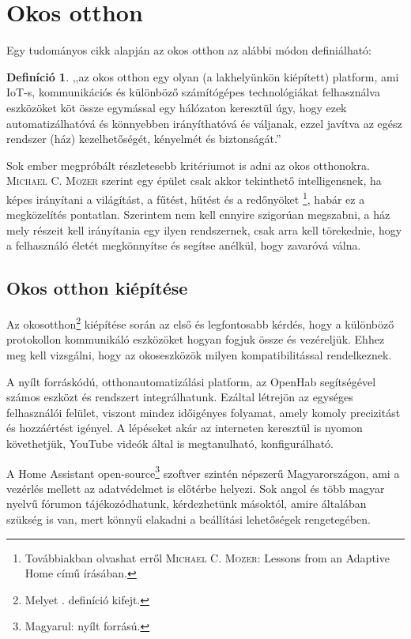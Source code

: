 \documentclass{thesis-ekf}
\theoremstyle{definition}
\newtheorem{definicio}[tetel]{Definíció}
\begin{document}
 

\section{Okos otthon}
Egy tudományos cikk alapján az okos otthon az alábbi módon definiálható:
\begin{definicio}\label{smarthomeDef}
,,az okos otthon egy olyan (a lakhelyünkön kiépített) platform, ami IoT-s, kommunikációs  és különböző számítógépes technológiákat felhasználva eszközöket köt össze egymással egy hálózaton keresztül úgy, hogy ezek automatizálhatóvá és könnyebben irányíthatóvá és váljanak, ezzel javítva az egész rendszer (ház) kezelhetőségét, kényelmét és biztonságát.''\cite{smarthome}
\end{definicio}
Sok ember megpróbált részletesebb kritériumot is adni az okos otthonokra. \textsc{Michael C. Mozer} szerint egy épület csak akkor tekinthető intelligensnek, ha képes irányítani a világítást,
a fűtést, hűtést és a redőnyöket \footnote{Továbbiakban olvashat erről \textsc{Michael C. Mozer}: Lessons from an Adaptive Home című írásában.\cite{Mozer}}, habár ez a megközelítés pontatlan. Szerintem nem kell ennyire szigorúan megszabni, a ház mely részeit kell irányítania egy ilyen rendszernek, csak arra kell törekednie, hogy a felhasználó életét megkönnyítse és
segítse anélkül, hogy zavaróvá válna.

\subsection{Okos otthon kiépítése}
Az okosotthon\footnote{Melyet . definíció kifejt.} kiépítése során az első és legfontosabb kérdés, hogy a különböző protokollon kommunikáló eszközöket hogyan fogjuk össze és vezéreljük. Ehhez meg kell vizsgálni, hogy az okoseszközök milyen kompatibilitással rendelkeznek.

A nyílt forráskódú, otthonautomatizálási platform, az OpenHab segítségével számos eszközt és rendszert integrálhatunk. Ezáltal létrejön az egységes felhasználói felület, viszont mindez időigényes folyamat, amely komoly precizitást és hozzáértést igényel. A lépéseket akár az interneten keresztül is nyomon követhetjük, YouTube videók által is megtanulható, konfigurálható.

A Home Assistant open-source\footnote{Magyarul: nyílt forrású.} szoftver szintén népszerű Magyarországon, ami a vezérlés mellett az adatvédelmet is előtérbe helyezi. Sok angol és több magyar nyelvű fórumon tájékozódhatunk, kérdezhetünk másoktól, amire általában szükség is van, mert könnyű elakadni a beállítási lehetőségek rengetegében.
\end{document}
